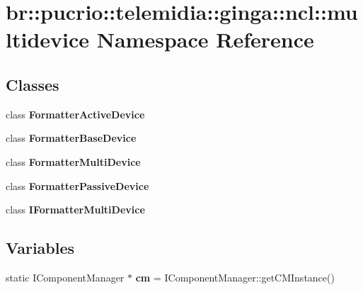 \section{br::pucrio::telemidia::ginga::ncl::multidevice Namespace Reference}
\label{namespacebr_1_1pucrio_1_1telemidia_1_1ginga_1_1ncl_1_1multidevice}


\subsection*{Classes}
\begin{CompactItemize}
\item 
class {\bf FormatterActiveDevice}
\item 
class {\bf FormatterBaseDevice}
\item 
class {\bf FormatterMultiDevice}
\item 
class {\bf FormatterPassiveDevice}
\item 
class {\bf IFormatterMultiDevice}
\end{CompactItemize}
\subsection*{Variables}
\begin{CompactItemize}
\item 
static IComponentManager $\ast$ {\bf cm} = IComponentManager::getCMInstance()\label{namespacebr_1_1pucrio_1_1telemidia_1_1ginga_1_1ncl_1_1multidevice_6d6e10571951a3a8a29be92d7f31a963}

\end{CompactItemize}
